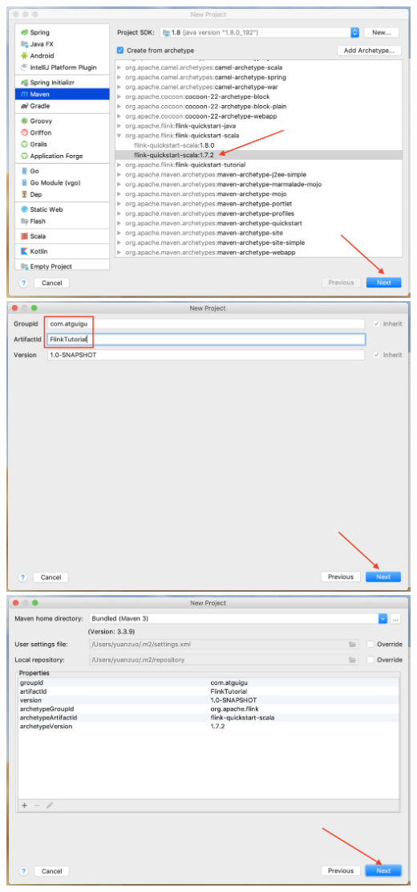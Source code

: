 \documentclass{ctexart}
\begin{document}
\includegraphics[width=\textwidth]{quickstart4.png}
\includegraphics[width=\textwidth]{quickstart5.png}
\includegraphics[width=\textwidth]{quickstart6.png}
\end{document}
